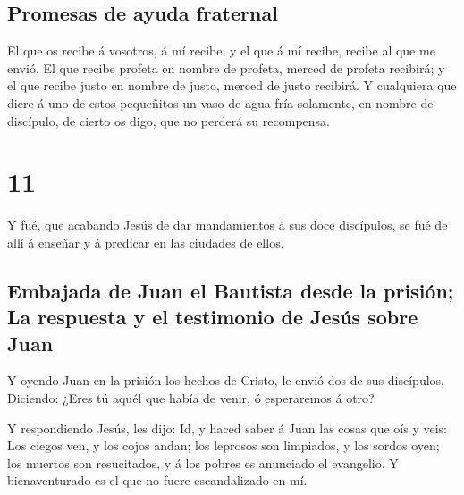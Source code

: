 \hypertarget{promesas-de-ayuda-fraternal}{%
\subsection{Promesas de ayuda
fraternal}\label{promesas-de-ayuda-fraternal}}

 El que os recibe á vosotros, á mí recibe; y el que á mí
recibe, recibe al que me envió.  El que recibe profeta en
nombre de profeta, merced de profeta recibirá; y el que recibe justo en
nombre de justo, merced de justo recibirá.  Y cualquiera
que diere á uno de estos pequeñitos un vaso de agua fría solamente, en
nombre de discípulo, de cierto os digo, que no perderá su recompensa.

\hypertarget{section-40-11}{%
\section{11}\label{section-40-11}}

 Y fué, que acabando Jesús de dar mandamientos á sus doce
discípulos, se fué de allí á enseñar y á predicar en las ciudades de
ellos.

\hypertarget{embajada-de-juan-el-bautista-desde-la-prisiuxf3n-la-respuesta-y-el-testimonio-de-jesuxfas-sobre-juan}{%
\subsection{Embajada de Juan el Bautista desde la prisión; La respuesta
y el testimonio de Jesús sobre
Juan}\label{embajada-de-juan-el-bautista-desde-la-prisiuxf3n-la-respuesta-y-el-testimonio-de-jesuxfas-sobre-juan}}

 Y oyendo Juan en la prisión los hechos de Cristo, le
envió dos de sus discípulos,  Diciendo: ¿Eres tú aquél que
había de venir, ó esperaremos á otro?

 Y respondiendo Jesús, les dijo: Id, y haced saber á Juan
las cosas que oís y veis:  Los ciegos ven, y los cojos
andan; los leprosos son limpiados, y los sordos oyen; los muertos son
resucitados, y á los pobres es anunciado el evangelio.  Y
bienaventurado es el que no fuere escandalizado en mí.

